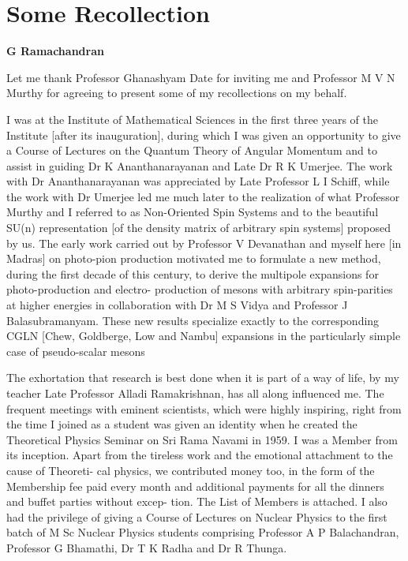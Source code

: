 \chapter{Some Recollection\protect\footnotemark[1]}\label{chap25}



\begin{center}
\textbf{G Ramachandran}
\end{center}

Let me thank Professor Ghanashyam Date for inviting me and Professor M V N Murthy
for agreeing to present some of my recollections on my behalf.

I was at the Institute of Mathematical Sciences in the first three years of the
Institute [after its inauguration], during which I was given an opportunity to give
a Course of Lectures on the Quantum Theory of Angular Momentum and to assist
in guiding Dr K Ananthanarayanan and Late Dr R K Umerjee. The work with Dr
Ananthanarayanan was appreciated by Late Professor L I Schiff, while the work with
Dr Umerjee led me much later to the realization of what Professor Murthy and I
referred to as Non-Oriented Spin Systems and to the beautiful SU(n) representation
[of the density matrix of arbitrary spin systems] proposed by us. The early work
carried out by Professor V Devanathan and myself here [in Madras] on photo-pion
production motivated me to formulate a new method, during the first decade of
this century, to derive the multipole expansions for photo-production and electro-
production of mesons with arbitrary spin-parities at higher energies in collaboration
with Dr M S Vidya and Professor J Balasubramanyam. These new results specialize
exactly to the corresponding CGLN [Chew, Goldberge, Low and Nambu] expansions
in the particularly simple case of pseudo-scalar mesons

The exhortation that research is best done when it is part of a way of life, by
my teacher Late Professor Alladi Ramakrishnan, has all along influenced me. The
frequent meetings with eminent scientists, which were highly inspiring, right from
the time I joined as a student was given an identity when he created the Theoretical
Physics Seminar on Sri Rama Navami in 1959. I was a Member from its inception.
Apart from the tireless work and the emotional attachment to the cause of Theoreti-
cal physics, we contributed money too, in the form of the Membership fee paid every
month and additional payments for all the dinners and buffet parties without excep-
tion. The List of Members is attached. I also had the privilege of giving a Course
of Lectures on Nuclear Physics to the first batch of M Sc Nuclear Physics students
comprising Professor A P Balachandran, Professor G Bhamathi, Dr T K Radha and
Dr R Thunga.

